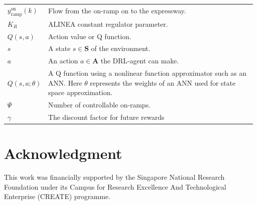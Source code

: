 \documentclass[conference]{IEEEtran}
\begin{document}
\begin{table}[!h]
{\begin{tabular}{p{1.5cm}p{6cm}}
			$y^{\text{on}}_{\text{ramp}}(k)$ & Flow from the on-ramp on to the expressway.                                                                                                                                                                                \\
			$K_R$                            & ALINEA constant regulator parameter.                                                                                                                                                                                       \\
			$Q(s,a)$                         & Action value or Q function.                                                                                                                                                                                                \\
			$s$                              & A state $s \in \mathbf{S}$ of the environment.                                                                                                                                                                             \\
			$a$                              & An action $a \in \mathbf{A}$ the DRL-agent  can make.                                                                                        \\
			$Q(s,a;\theta)$                  & A Q function using a nonlinear function approximator such as an \ac{ANN}. Here $\theta$ represents the weights  of an \ac{ANN} used for state space approximation. \\
			$\Psi$                           & Number of controllable on-ramps.         
			\\
			$\gamma$ & The discount factor for future rewards                                                                                                                                                            \\ \bottomrule
	\end{tabular}}
\end{table}




\section*{Acknowledgment}
This work was financially supported by the Singapore National Research Foundation under its Campus for Research Excellence And Technological Enterprise (CREATE) programme.
\end{document}
